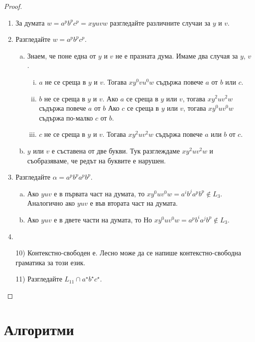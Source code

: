 \begin{proof}
  \begin{enumerate}[1)]
  \item
    За думата $w = a^pb^pc^p = xyuvw$ разгледайте различните случаи за $y$ и $v$.
  \item
    Разгледайте $w = a^pb^pc^p$.
    \begin{enumerate}[a)]
    \item
      Знаем, че поне една от $y$ и $v$ не е празната дума.
      Имаме два случая за $y$, $v$.
      \begin{enumerate}[i)]
      \item
        $a$ не се среща в $y$ и $v$.
        Тогава $xy^0vu^0w$ съдържа повече $a$ от $b$ или $c$.
      \item
        $b$ не се среща в $y$ и $v$.
        Ако $a$ се среща в $y$ или $v$, тогава $xy^2uv^2w$ съдържа повече $a$ от $b$
        Ако $c$ се среща в $y$ или $v$, тогава $xy^0uv^0w$ съдържа по-малко $c$ от $b$.
      \item
        $c$ не се среща в $y$ и $v$.
        Тогава $xy^2uv^2w$ съдържа повече $a$ или $b$ от $c$.
      \end{enumerate}      
    \item
      $y$ или $v$ е съставена от две букви.
      Тук разглеждаме $xy^2uv^2w$ и съобразяваме, че редът на буквите е нарушен.
    \end{enumerate}
  \item
    Разгледайте $\alpha = a^pb^pa^pb^p$.
    \begin{enumerate}[a)]
    \item
      Ако $yuv$ е в първата част на думата, то 
      $xy^0uv^0w = a^ib^ja^pb^p \not\in L_3$.
      Аналогично ако $yuv$ е във втората част на думата.
    \item
      Ако $yuv$ е в двете части на думата, то 
      Но $xy^0uv^0w = a^pb^ia^jb^p \not\in L_3$.
    \end{enumerate}
  \item
  \item[10)]
    Контекстно-свободен е. Лесно може да се напише контекстно-свободна граматика за този език.
  \item[11)]
    Разгледайте $L_{11} \cap a^\star b^\star c^\star$.
  \end{enumerate}
\end{proof}


\section{Алгоритми}

